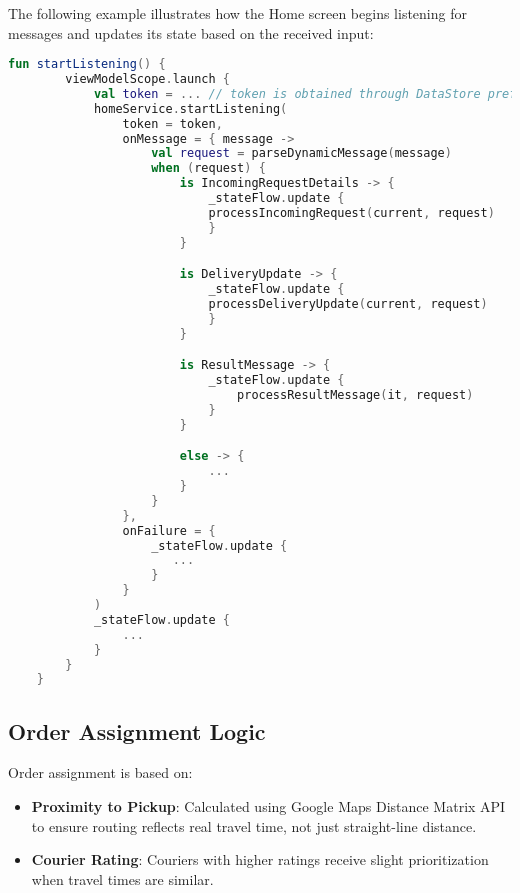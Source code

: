 The following example illustrates how the Home screen begins listening for messages and updates its state based on the received input:

\begin{lstlisting}[language=Kotlin, caption={WebSocket startListening where message handling is defined}]
fun startListening() {
        viewModelScope.launch {
            val token = ... // token is obtained through DataStore preferences
            homeService.startListening(
                token = token,
                onMessage = { message ->
                    val request = parseDynamicMessage(message)
                    when (request) {
                        is IncomingRequestDetails -> {
                            _stateFlow.update { 
                            processIncomingRequest(current, request)
                            }
                        }

                        is DeliveryUpdate -> {
                            _stateFlow.update { 
                            processDeliveryUpdate(current, request)
                            }
                        }

                        is ResultMessage -> {
                            _stateFlow.update {
                                processResultMessage(it, request)
                            }
                        }

                        else -> {
                            ...
                        }
                    }
                },
                onFailure = {
                    _stateFlow.update {
                       ...
                    }
                }
            )
            _stateFlow.update { 
                ...
            }
        }
    }
\end{lstlisting}

\subsection{Order Assignment Logic}

Order assignment is based on:

\begin{itemize}
    \item \textbf{Proximity to Pickup}: Calculated using Google Maps Distance Matrix API to ensure routing reflects real travel time, not just straight-line distance.
    \item \textbf{Courier Rating}: Couriers with higher ratings receive slight prioritization when travel times are similar.
\end{itemize}

